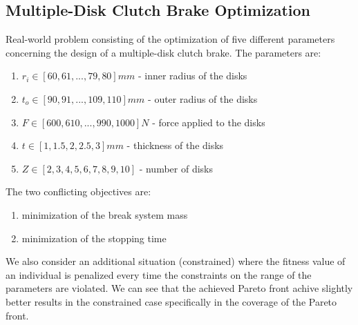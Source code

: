 \subsection{Multiple-Disk Clutch Brake Optimization}
Real-world problem consisting of the optimization of five different parameters concerning the design of a multiple-disk clutch brake. The parameters are:
\begin{enumerate}
    \item $r_i \in [60,61,...,79,80]mm$ - inner radius of the disks
    \item $t_o \in [90,91,...,109,110]mm$ - outer radius of the disks
    \item $F \in [600,610,...,990,1000]N$ - force applied to the disks
    \item $t \in [1,1.5,2,2.5,3]mm$ - thickness of the disks
    \item $Z \in [2,3,4,5,6,7,8,9,10]$ - number of disks
\end{enumerate}
The two conflicting objectives are:
\begin{enumerate}
    \item minimization of the break system mass
    \item minimization of the stopping time
\end{enumerate}
We also consider an additional situation (constrained) where the fitness value of an individual is penalized every time the constraints on the range of the parameters are violated. We can see that the achieved Pareto front achive slightly better results in the constrained case specifically in the coverage of the Pareto front.
